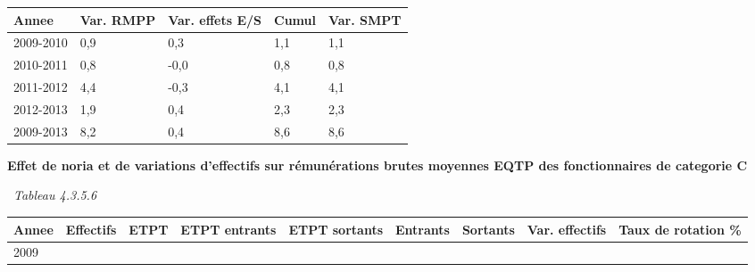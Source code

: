 \begin{longtable}[]{@{}lllll@{}}
\toprule
Annee & Var. RMPP & Var. effets E/S & Cumul & Var. SMPT\tabularnewline
\midrule
\endhead
2009-2010 & 0,9 & 0,3 & 1,1 & 1,1\tabularnewline
2010-2011 & 0,8 & -0,0 & 0,8 & 0,8\tabularnewline
2011-2012 & 4,4 & -0,3 & 4,1 & 4,1\tabularnewline
2012-2013 & 1,9 & 0,4 & 2,3 & 2,3\tabularnewline
2009-2013 & 8,2 & 0,4 & 8,6 & 8,6\tabularnewline
\bottomrule
\end{longtable}

\textbf{Effet de noria et de variations d'effectifs sur rémunérations
brutes moyennes EQTP des fonctionnaires de categorie C}

~\emph{Tableau 4.3.5.6}

\begin{longtable}[]{@{}lllllllll@{}}
\toprule
\begin{minipage}[b]{0.05\columnwidth}\raggedright
Annee\strut
\end{minipage} & \begin{minipage}[b]{0.08\columnwidth}\raggedright
Effectifs\strut
\end{minipage} & \begin{minipage}[b]{0.05\columnwidth}\raggedright
ETPT\strut
\end{minipage} & \begin{minipage}[b]{0.10\columnwidth}\raggedright
ETPT entrants\strut
\end{minipage} & \begin{minipage}[b]{0.10\columnwidth}\raggedright
ETPT sortants\strut
\end{minipage} & \begin{minipage}[b]{0.07\columnwidth}\raggedright
Entrants\strut
\end{minipage} & \begin{minipage}[b]{0.07\columnwidth}\raggedright
Sortants\strut
\end{minipage} & \begin{minipage}[b]{0.11\columnwidth}\raggedright
Var. effectifs\strut
\end{minipage} & \begin{minipage}[b]{0.14\columnwidth}\raggedright
Taux de rotation \%\strut
\end{minipage}\tabularnewline
\midrule
\endhead
\begin{minipage}[t]{0.05\columnwidth}\raggedright
2009\strut
\end{minipage} & \begin{minipage}[t]{0.08\columnwidth}\raggedright

\end{minipage}
\end{longtable}
